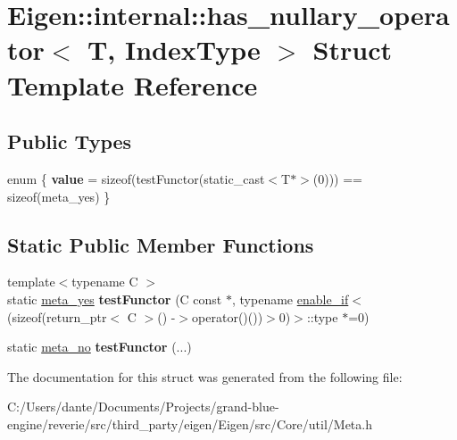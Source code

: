 \hypertarget{struct_eigen_1_1internal_1_1has__nullary__operator}{}\section{Eigen\+::internal\+::has\+\_\+nullary\+\_\+operator$<$ T, Index\+Type $>$ Struct Template Reference}
\label{struct_eigen_1_1internal_1_1has__nullary__operator}
\subsection*{Public Types}
\begin{DoxyCompactItemize}
\item 
\mbox{\label{struct_eigen_1_1internal_1_1has__nullary__operator_aa0ca2d7e8f66d0f32787c2d536953197}} 
enum \{ {\bfseries value} = sizeof(test\+Functor(static\+\_\+cast$<$T$\ast$$>$(0))) == sizeof(meta\+\_\+yes)
 \}
\end{DoxyCompactItemize}
\subsection*{Static Public Member Functions}
\begin{DoxyCompactItemize}
\item 
\mbox{\label{struct_eigen_1_1internal_1_1has__nullary__operator_ae734e5f26d9632a75bb0a0113b4a2f5d}} 
{\footnotesize template$<$typename C $>$ }\\static \mbox{\hyperlink{struct_eigen_1_1internal_1_1meta__yes}{meta\+\_\+yes}} {\bfseries test\+Functor} (C const $\ast$, typename \mbox{\hyperlink{struct_eigen_1_1internal_1_1enable__if}{enable\+\_\+if}}$<$(sizeof(return\+\_\+ptr$<$ C $>$() -\/$>$operator()())$>$0)$>$\+::type $\ast$=0)
\item 
\mbox{\label{struct_eigen_1_1internal_1_1has__nullary__operator_a5ec0cda0d8cfedf9c26a9c3d352b7914}} 
static \mbox{\hyperlink{struct_eigen_1_1internal_1_1meta__no}{meta\+\_\+no}} {\bfseries test\+Functor} (...)
\end{DoxyCompactItemize}


The documentation for this struct was generated from the following file\+:\begin{DoxyCompactItemize}
\item 
C\+:/\+Users/dante/\+Documents/\+Projects/grand-\/blue-\/engine/reverie/src/third\+\_\+party/eigen/\+Eigen/src/\+Core/util/Meta.\+h\end{DoxyCompactItemize}
